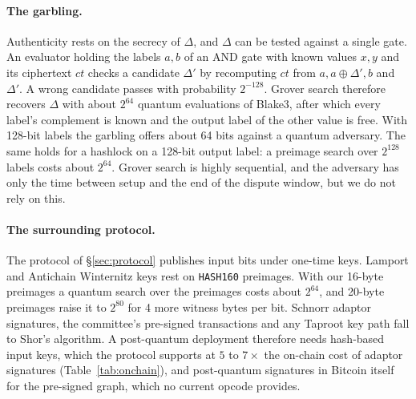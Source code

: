 \documentclass[11pt]{article}
\newcommand{\AND}{\textsf{AND}}
\begin{document}
\paragraph{The garbling.} Authenticity rests on the secrecy of $\Delta$, and
$\Delta$ can be tested against a single gate. An evaluator holding the labels
$a,b$ of an \AND{} gate with known values $x,y$ and its ciphertext $\mathit{ct}$
checks a candidate $\Delta'$ by recomputing $\mathit{ct}$ from
$a,a\oplus\Delta',b$ and $\Delta'$. A wrong candidate passes with probability
$2^{-128}$. Grover search therefore recovers $\Delta$ with about $2^{64}$
quantum evaluations of Blake3, after which every label's complement is known
and the output label of the other value is free. With 128-bit labels the
garbling offers about 64 bits against a quantum adversary. The same holds for a
hashlock on a 128-bit output label: a preimage search over $2^{128}$ labels costs
about $2^{64}$. Grover search is highly sequential, and the adversary has only the
time between setup and the end of the dispute window, but we do not rely on
this.

\paragraph{The surrounding protocol.} The protocol of \S\ref{sec:protocol}
publishes input bits under one-time keys. Lamport and Antichain Winternitz keys
rest on \texttt{HASH160} preimages. With our 16-byte preimages a quantum search
over the preimages costs about $2^{64}$, and 20-byte preimages raise it to
$2^{80}$ for 4 more witness bytes per bit.
Schnorr adaptor signatures, the committee's pre-signed transactions and any
Taproot key path fall to Shor's algorithm. A post-quantum deployment therefore
needs hash-based input keys, which the protocol supports at $5$ to $7\times$ the
on-chain cost of adaptor signatures (Table~\ref{tab:onchain}), and post-quantum
signatures in Bitcoin itself for the pre-signed graph, which no current opcode
provides.
\end{document}
